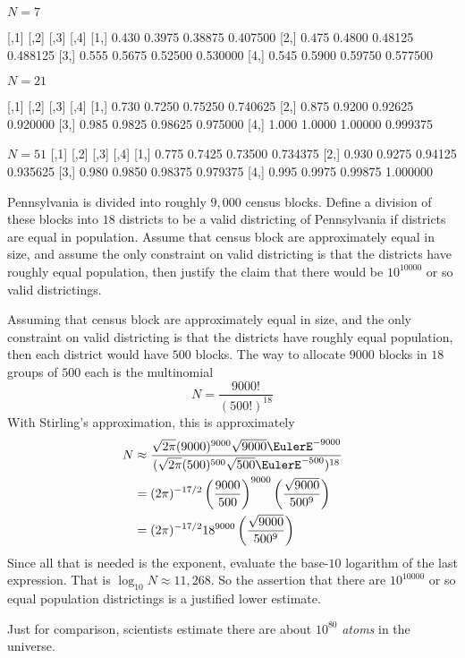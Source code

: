 \documentclass[12pt]{article}
\begin{document}
\begin{solution}
  \( N= 7 \)

        [,1]   [,2]    [,3]     [,4]
[1,] 0.430 0.3975 0.38875 0.407500
[2,] 0.475 0.4800 0.48125 0.488125
[3,] 0.555 0.5675 0.52500 0.530000
[4,] 0.545 0.5900 0.59750 0.577500

\( N = 21 \)

      [,1]   [,2]    [,3]     [,4]
[1,] 0.730 0.7250 0.75250 0.740625
[2,] 0.875 0.9200 0.92625 0.920000
[3,] 0.985 0.9825 0.98625 0.975000
[4,] 1.000 1.0000 1.00000 0.999375

\( N = 51 \)
      [,1]   [,2]    [,3]     [,4]
[1,] 0.775 0.7425 0.73500 0.734375
[2,] 0.930 0.9275 0.94125 0.935625
[3,] 0.980 0.9850 0.98375 0.979375
[4,] 0.995 0.9975 0.99875 1.000000

\end{solution}

\begin{exercise}
    Pennsylvania is divided into roughly \( 9,000 \) census blocks.
    Define a division of these blocks into \( 18 \) districts to be a
    valid districting of Pennsylvania if districts are equal in
    population. Assume that census block are approximately equal in
    size, and assume the only constraint on valid districting is that
    the districts have roughly equal population, then justify the claim
    that there would be \( 10^{10000} \) or so valid districtings.
\end{exercise}

\begin{solution}
    Assuming that census block are approximately equal in size, and the
    only constraint on valid districting is that the districts have
    roughly equal population, then each district would have \( 500 \)
    blocks.  The way to allocate \( 9000 \) blocks in \( 18 \) groups of
    \( 500 \) each is the multinomial
    \[
        N = \frac{9000!}{(500!)^{18}}
    \] With Stirling's approximation, this is approximately
    \begin{align*}
        N &\approx \frac{\sqrt{2\pi} (9000)^{9000} \sqrt{9000} \EulerE^{-9000}}
        {(\sqrt{2\pi} (500)^{500} \sqrt{500} \EulerE^{-500})^{18}} \\
        &= (2\pi)^{-17/2} \left( \frac{9000}{500} \right)^{9000} \left(
        \frac{\sqrt{9000}}{500^{9}} \right) \\
        &= (2\pi)^{-17/2} 18^{9000} \left( \frac{\sqrt{9000}}{500^{9}}
        \right) \\
    \end{align*}
    Since all that is needed is the exponent, evaluate the base-\( 10 \)
    logarithm of the last expression.  That is \( \log_{10} N \approx 11
    {,}268 \).  So the assertion that there are \( 10^{10000} \) or so
    equal population districtings is a justified lower estimate.

    Just for comparison, scientists estimate there are about \( 10^{80} \)
    \emph{atoms} in the universe.
  \end{solution}
\end{document}

